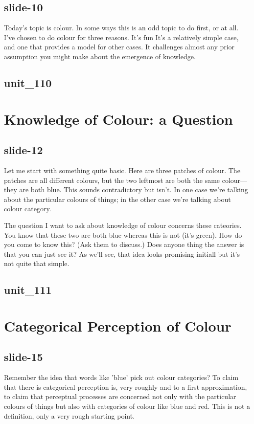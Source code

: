 \documentclass[12pt,\papersize]{extarticle}
\begin{document}
 
\subsection{slide-10}
Today's topic is colour.
In some ways this is an odd topic to do first, or at all.
I've chosen to do colour for three reasons. It's fun It's a relatively simple case, and one that provides a model for other cases. It challenges almost any prior assumption you might make about the emergence of knowledge.
 
 
\subsection{unit\_110}
 
\section{Knowledge of Colour: a Question}
 
 
\subsection{slide-12}
Let me start with something quite basic.
Here are three patches of colour.
The patches are all different colours, but the two leftmost are both the same colour---they are both blue.
This sounds contradictory but isn't.
In one case we're talking about the particular colours of things; in the other case we're talking about colour category.
 
The question I want to ask about knowledge of colour concerns these cateories.
You know that these two are both blue whereas this is not (it's green).
How do you come to know this?
(Ask them to discuss.)
Does anyone thing the answer is that you can just see it? As we'll see, that idea looks promising initiall but it's not quite that simple.
 
 
\subsection{unit\_111}
 
\section{Categorical Perception of Colour}
 
 
\subsection{slide-15}
Remember the idea that words like 'blue' pick out colour categories?
To claim that there is categorical perception is, very roughly and to a first approximation, to claim that perceptual processes are concerned not only with the particular colours of things but also with categories of colour like blue and red.
This is not a definition, only a very rough starting point.
 
\end{document}
